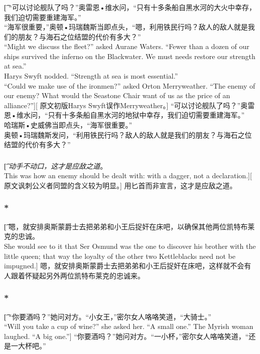 \documentclass[12pt,a4paper]{article}
\begin{document}
\subsubsection{}\t[
	“可以讨论舰队了吗？”奥雷恩•维水问，“只有十多条船自黑水河的大火中幸存，我们迫切需要重建海军。”\\
	“海军很重要，”奥顿•玛瑞魏斯当即点头，“嗯，利用铁民行吗？敌人的敌人就是我们的朋友？与海石之位结盟的代价有多大？”\\
	“Might we discuss the fleet?” asked Aurane Waters. “Fewer than a dozen of our ships survived the inferno on the Blackwater. We must needs restore our strength at sea.”\\
	Harys Swyft nodded. “Strength at sea is most essential.”\\
	“Could we make use of the ironmen?” asked Orton Merryweather. “The enemy of our enemy? What would the Seastone Chair want of us as the price of an alliance?”][
	原文初版Harys Swyft误作Merryweather。]
	“可以讨论舰队了吗？”奥雷恩•维水问，“只有十多条船自黑水河的地狱中幸存，我们迫切需要重建海军。”\\
	哈瑞斯•史威佛当即点头，“海军很重要。”\\
	奥顿•玛瑞魏斯发问，“利用铁民行吗？敌人的敌人就是我们的朋友？与海石之位结盟的代价有多大？”
	
\subsubsection{}\t[
	\emph{动手不动口，这才是应敌之道}。\\
	This was how an enemy should be dealt with: with a dagger, not a declaration.][
	原文讽刺公义者同盟的含义较为明显。]
	用匕首而非宣言，这才是应敌之道。
	
\subsubsection{\color{red}*}\t[
	嗯，就安排奥斯蒙爵士去把弟弟和小王后捉奸在床吧，以确保其他两位凯特布莱克的忠诚。\\
	She would see to it that Ser Osmund was the one to discover his brother with the little queen; that way the loyalty of the other two Kettleblacks need not be impugned.]
	嗯，就安排奥斯蒙爵士去把弟弟和小王后捉奸在床吧，这样就不会有人跟着怀疑起另外两位凯特布莱克的忠诚来。
	
\subsubsection{\color{red}*}\t[
	“你要酒吗？”她问对方。“小女王，”密尔女人咯咯笑道，“大骑士。”\\
	“Will you take a cup of wine?” she asked her. “A small one.” The Myrish woman laughed. “A big one.”]
	“你要酒吗？”她问对方。“一小杯，”密尔女人咯咯笑道，“还是一大杯吧。”
	
\end{document}
